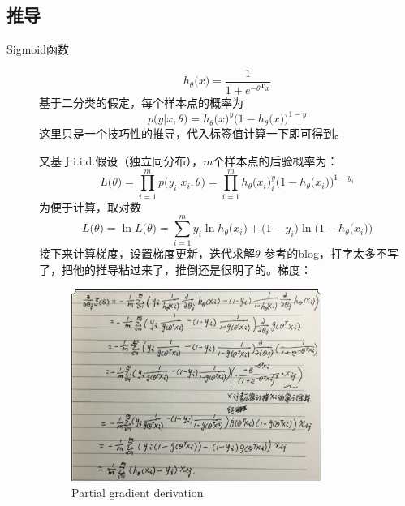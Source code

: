 \documentclass{ctexart}
\begin{document}
\subsection{推导}
\label{derivations}
\begin{description}
\item[Sigmoid函数]
\begin{equation}
h_\theta\big(x\big) =\frac{1}{1+e^{-\theta^{\mathbf{T}}x}}
\end{equation}
基于二分类的假定，每个样本点的概率为
\begin{equation}
p\big(y|x,\theta \big) = {h_\theta\big(x\big)}^y{\big(1-h_\theta\big(x\big)\big)}^{1-y}
\end{equation}
这里只是一个技巧性的推导，代入标签值计算一下即可得到。

又基于i.i.d.假设（独立同分布），$m$个样本点的后验概率为：
\begin{equation}
L\big(\theta\big)=\prod_{i=1}^{m}p\big(y_i|x_i,\theta \big) =\prod_{i=1}^{m} {h_\theta\big(x_i\big)}^y_i{\big(1-h_\theta\big(x_i\big)\big)}^{1-y_i}
\end{equation}
为便于计算，取对数
\begin{equation}
L\big(\theta\big)=\ln L\big(\theta\big)=\sum_{i=1}^{m} y_i\ln {h_\theta\big(x_i\big)}+\big(1-y_i\big) \ln {\big(1-h_\theta\big(x_i\big)\big)}
\end{equation}
接下来计算梯度，设置梯度更新，迭代求解$\theta$
参考的blog，打字太多不写了，把他\cite{lr:implement}的推导粘过来了，推倒还是很明了的。梯度：
\begin{figure}[H]
\begin{center}
\includegraphics[width=0.8\textwidth]{partialDerivations} %
\caption{Partial gradient derivation}
\end{center}
\end{figure}


\end{description}
\end{document}
